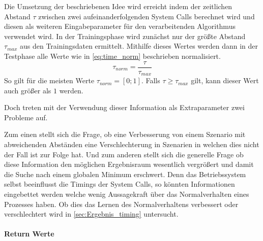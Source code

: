                 Die Umsetzung der beschriebenen Idee wird erreicht indem der zeitlichen Abstand $\tau$ zwischen zwei aufeinanderfolgenden System Calls berechnet wird und diesen als weiteren Eingabeparameter für den verarbeitenden Algorithmus verwendet wird.
                In der Trainingsphase wird zunächst nur der größte Abstand $\tau_{max}$ aus den Trainingsdaten ermittelt.
                Mithilfe dieses Wertes werden dann in der Testphase alle Werte wie in \autoref{eq:time_norm} beschrieben normalisiert.
                \begin{equation}\label{eq:time_norm}
                    \tau_{norm} = \frac{\tau}{\tau_{max}}
                \end{equation}
                So gilt für die meisten Werte $\tau_{norm}=[0;1]$.
                Falls $\tau\geq\tau_{max}$ gilt, kann dieser Wert auch größer als $1$ werden.

                Doch treten mit der Verwendung dieser Information als Extraparameter zwei Probleme auf.

                Zum einen stellt sich die Frage, ob eine Verbesserung von einem Szenario mit abweichenden Abständen eine Verschlechterung in Szenarien in welchen dies nicht der Fall ist zur Folge hat.
                Und zum anderen stellt sich die generelle Frage ob diese Information den möglichen Ergebnisraum wesentlich vergrößert und damit die Suche nach einem globalen Minimum erschwert.
                Denn das Betriebssystem selbst beeinflusst die Timings der System Calls, so könnten Informationen eingebettet werden welche wenig Aussagekraft über das Normalverhalten eines Prozesses haben.
                Ob dies das Lernen des Normalverhaltens verbessert oder verschlechtert wird in \autoref{sec:Ergebnis_timing} untersucht.

            \paragraph{Return Werte}

